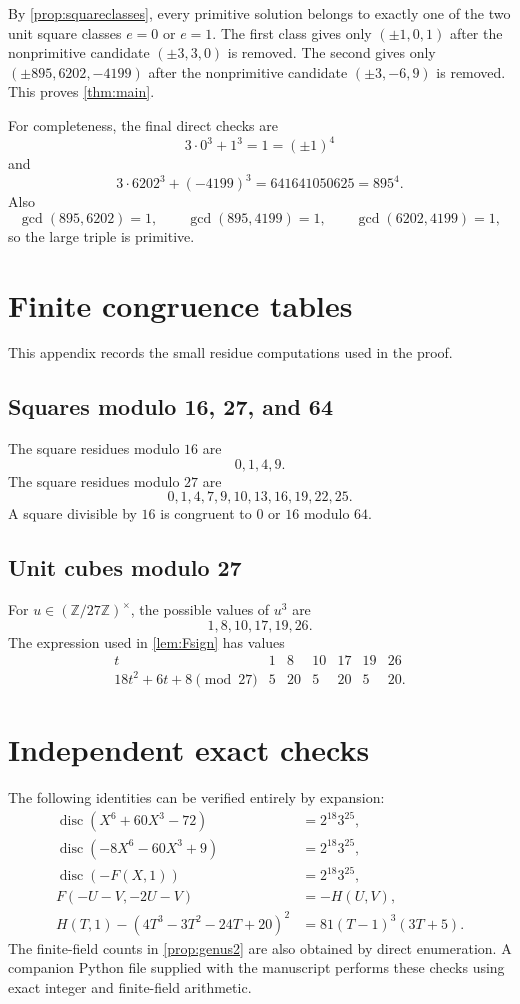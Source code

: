\documentclass[11pt,a4paper]{article}
\newcommand{\Z}{\mathbb Z}
\begin{document}
By \cref{prop:squareclasses}, every primitive solution belongs to exactly
one of the two unit square classes $e=0$ or $e=1$.  The first class gives
only $(\pm1,0,1)$ after the nonprimitive candidate $(\pm3,3,0)$ is
removed.  The second gives only $(\pm895,6202,-4199)$ after the
nonprimitive candidate $(\pm3,-6,9)$ is removed.  This proves
\cref{thm:main}.

For completeness, the final direct checks are
\[
3\cdot0^3+1^3=1=(\pm1)^4
\]
and
\[
3\cdot6202^3+(-4199)^3
 =641641050625
 =895^4.
\]
Also
\[
\gcd(895,6202)=1,
\qquad
\gcd(895,4199)=1,
\qquad
\gcd(6202,4199)=1,
\]
so the large triple is primitive.

\appendix

\section{Finite congruence tables}

This appendix records the small residue computations used in the proof.

\subsection{Squares modulo 16, 27, and 64}

The square residues modulo $16$ are
\[
0,1,4,9.
\]
The square residues modulo $27$ are
\[
0,1,4,7,9,10,13,16,19,22,25.
\]
A square divisible by $16$ is congruent to $0$ or $16$ modulo $64$.

\subsection{Unit cubes modulo 27}

For $u\in(\Z/27\Z)^\times$, the possible values of $u^3$ are
\[
1,8,10,17,19,26.
\]
The expression used in \cref{lem:Fsign} has values
\[
\begin{array}{c|rrrrrr}
t&1&8&10&17&19&26\\ \hline
18t^2+6t+8\pmod{27}&5&20&5&20&5&20.
\end{array}
\]

\section{Independent exact checks}

The following identities can be verified entirely by expansion:
\begin{align*}
\operatorname{disc}(X^6+60X^3-72)
 &=2^{18}3^{25},\\
\operatorname{disc}(-8X^6-60X^3+9)
 &=2^{18}3^{25},\\
\operatorname{disc}(-F(X,1))
 &=2^{18}3^{25},\\
F(-U-V,-2U-V)&=-H(U,V),\\
H(T,1)-(4T^3-3T^2-24T+20)^2
 &=81(T-1)^3(3T+5).
\end{align*}
The finite-field counts in \cref{prop:genus2} are also obtained by direct
enumeration.  A companion Python file supplied with the manuscript performs
these checks using exact integer and finite-field arithmetic.
\end{document}
